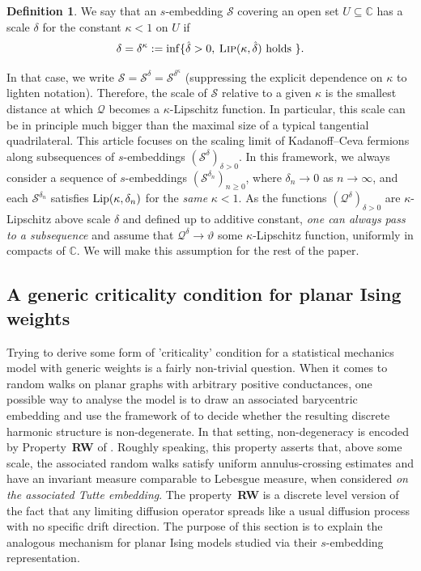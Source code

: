 \documentclass[reqno]{amsart}
\numberwithin{equation}{section}
\theoremstyle{definition}
\newtheorem{definition}[theo]{Definition}
\theoremstyle{remark}
\newcommand\cQ{\mathcal{Q}}
\newcommand\cS{\mathcal{S}}
\begin{document}
\begin{definition}
We say that an $s$-embedding $\cS $ covering an open set $U\subseteq \mathbb{C}$ has a scale $\delta $ for the constant $ \kappa <1$ on $U$ if 
\begin{equation}
\delta = \delta^{\kappa} := \inf \{ \hat{\delta} >0, \: \textsc{Lip}(\kappa, \hat{\delta}) \textrm{ holds } \}.
\end{equation}
\end{definition}
In that case, we write $\cS=\cS^{\delta}=\cS^{\delta^\kappa}$ (suppressing the explicit dependence on $\kappa$ to lighten notation). Therefore, the scale of $\cS$ relative to a given $\kappa$ is the smallest distance at which $\cQ$ becomes a $\kappa$-Lipschitz function. In particular, this scale can be in principle much bigger than the maximal size of a typical tangential quadrilateral. This article focuses on the scaling limit of Kadanoff–Ceva fermions along subsequences of $s$-embeddings $(\cS^\delta)_{\delta>0}$.
 In this framework, we always consider a sequence of $s$-embeddings $(\cS^{\delta_n})_{n \geq 0}$, where $\delta_{n}\to0$ as $n\to\infty$, and each $\cS^{\delta_n}$ satisfies $\textup{Lip}(\kappa,\delta_n)$ for the \emph{same} $\kappa<1$.  As the functions $(\cQ^\delta)_{\delta >0} $ are $\kappa$-Lipschitz above scale $\delta $ and defined up to  additive constant, \emph{one can always pass to a subsequence} and assume that $\cQ^\delta \to \vartheta $ some $\kappa$-Lipschitz function, uniformly in compacts of $\mathbb{C}$. We will make this assumption for the rest of the paper.


\subsection{A generic criticality condition for planar Ising weights} Trying to derive some form of 'criticality' condition for a statistical mechanics model with generic weights is a fairly non-trivial question. When it comes to random walks on planar graphs with arbitrary positive conductances, one possible way to analyse the model is to draw an associated barycentric embedding and use the framework of \cite{BCLR} to decide whether the resulting discrete harmonic structure is non-degenerate. In that setting, non-degeneracy is encoded by Property~{\bf RW} of \cite[Section~1.6]{BCLR}. Roughly speaking, this property asserts that, above some scale, the associated random walks satisfy uniform annulus-crossing estimates and have an invariant measure comparable to Lebesgue measure, when considered \emph{on the associated Tutte embedding}. The property~{\bf RW} is a discrete level version of the fact that any limiting diffusion operator spreads like a usual diffusion process with no specific drift direction. The purpose of this section is to explain the analogous mechanism for planar Ising models studied via their $s$-embedding representation. 
\end{document}
